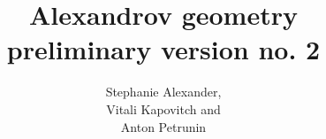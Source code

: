 \frontmatter
\title{Alexandrov geometry\\
{\large preliminary version no. 2}}
\date{}
\author{Stephanie Alexander,\\ Vitali Kapovitch and\\ Anton Petrunin}
\maketitle
